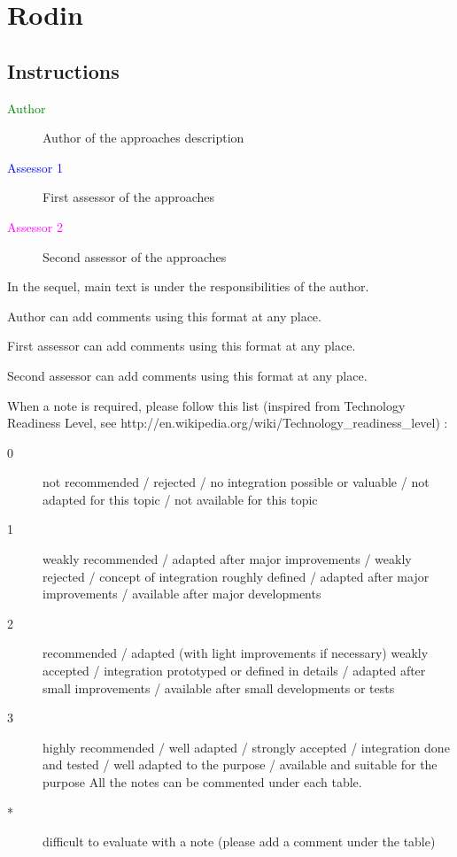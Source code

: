 \chapter{Rodin}
\label{sec:rodin}

\section{Instructions}

\begin{description}
\item[\textcolor{green}{Author}] Author of the approaches description  
\item[\textcolor{blue}{Assessor 1}] First assessor of the approaches 
\item[\textcolor{magenta}{Assessor 2}] Second assessor of the approaches 
\end{description}

In the sequel, main text is under the responsibilities of the author.

\begin{author_comment}
Author can add comments using this format at any place.
\end{author_comment}

\begin{assessor1}
First assessor can add comments using this format at any place.
\end{assessor1}

\begin{assessor2}
Second assessor can add comments using this format at any place.
\end{assessor2}

When a note is required, please follow this list (inspired from Technology Readiness Level, see http://en.wikipedia.org/wiki/Technology\_readiness\_level) :

\begin{description}
\item[0] not recommended / rejected / no integration possible or valuable / not adapted for this topic / not available for this topic
\item[1] weakly recommended / adapted after major improvements / weakly rejected / concept of integration roughly defined / adapted after major improvements / available after major developments
\item[2] recommended / adapted (with light improvements if necessary)  weakly accepted / integration prototyped or defined in details / adapted after small improvements / available after small developments or tests
\item[3] highly recommended / well adapted / strongly accepted / integration done and tested / well adapted to the purpose / available and suitable for the purpose All the notes can be commented under each table.
\item[*] difficult to evaluate with a note (please add a comment under the table)
\end{description}

